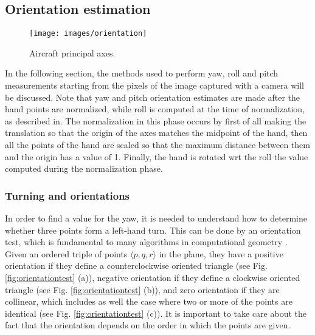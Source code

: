 \subsection{Orientation estimation}
\label{sec:orientationestimation}

\begin{figure}[H]
	\centering
	\texttt{[image: images/orientation]}
	\caption[Aircraft principal axes.]{Aircraft principal axes.}
	\label{fig:orientation}
\end{figure}

In the following section, the methods used to perform yaw, roll and pitch measurements starting from the pixels of the image captured with a camera will be discussed. Note that yaw and pitch orientation estimates are made after the hand points are normalized, while roll is computed at the time of normalization, as described in. The normalization in this phase occurs by first of all making the translation so that the origin of the axes matches the midpoint of the hand, then all the points of the hand are scaled so that the maximum distance between them and the origin has a value of 1. Finally, the hand is rotated \gls{wrt} the roll the value computed during the normalization phase.

\subsubsection{Turning and orientations}
\label{subsec:orientationtest}

In order to find a value for the yaw, it is needed to understand how to determine whether three points form a left-hand turn. This can be done by an orientation test, which is fundamental to many algorithms in computational geometry \cite[]{CMSC75428:online}. Given an ordered triple of points $\langle p, q, r \rangle$ in the plane, they have a positive orientation if they define a counterclockwise oriented triangle (see Fig. \ref{fig:orientationtest} (a)), negative orientation if they define a clockwise oriented triangle (see Fig. \ref{fig:orientationtest} (b)), and zero orientation if they are collinear, which includes as well the case where two or more of the points are identical (see Fig. \ref{fig:orientationtest} (c)). It is important to take care about the fact that the orientation depends on the order in which the points are given.

